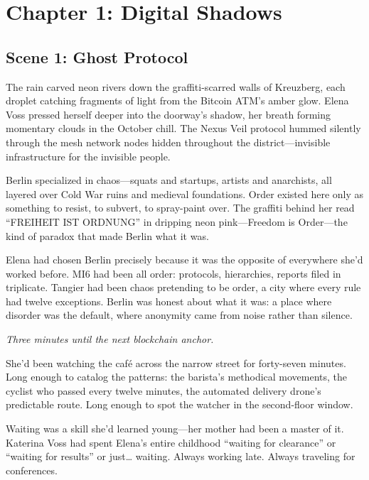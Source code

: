 \hypertarget{chapter-1-digital-shadows}{%
\section{Chapter 1: Digital Shadows}\label{chapter-1-digital-shadows}}

\hypertarget{scene-1-ghost-protocol}{%
\subsection{Scene 1: Ghost Protocol}\label{scene-1-ghost-protocol}}

The rain carved neon rivers down the graffiti-scarred walls of Kreuzberg, each droplet catching fragments of light from the Bitcoin ATM's amber glow. Elena Voss pressed herself deeper into the doorway's shadow, her breath forming momentary clouds in the October chill. The Nexus Veil protocol hummed silently through the mesh network nodes hidden throughout the district---invisible infrastructure for the invisible people.

Berlin specialized in chaos---squats and startups, artists and anarchists, all layered over Cold War ruins and medieval foundations. Order existed here only as something to resist, to subvert, to spray-paint over. The graffiti behind her read ``FREIHEIT IST ORDNUNG'' in dripping neon pink---Freedom is Order---the kind of paradox that made Berlin what it was.

Elena had chosen Berlin precisely because it was the opposite of everywhere she'd worked before. MI6 had been all order: protocols, hierarchies, reports filed in triplicate. Tangier had been chaos pretending to be order, a city where every rule had twelve exceptions. Berlin was honest about what it was: a place where disorder was the default, where anonymity came from noise rather than silence.

\emph{Three minutes until the next blockchain anchor.}

She'd been watching the café across the narrow street for forty-seven minutes. Long enough to catalog the patterns: the barista's methodical movements, the cyclist who passed every twelve minutes, the automated delivery drone's predictable route. Long enough to spot the watcher in the second-floor window.

Waiting was a skill she'd learned young---her mother had been a master of it. Katerina Voss had spent Elena's entire childhood ``waiting for clearance'' or ``waiting for results'' or just\ldots{} waiting. Always working late. Always traveling for conferences.

